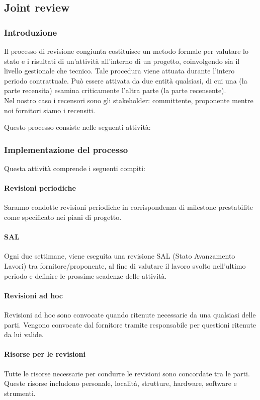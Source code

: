 \subsection{Joint review}
\subsubsection{Introduzione}
Il processo di revisione congiunta costituisce un metodo formale per valutare lo stato e i risultati di un'attività all'interno di un progetto, coinvolgendo sia il livello gestionale che tecnico. Tale procedura viene attuata durante l'intero periodo contrattuale. Può essere attivata da due entità qualsiasi, di cui una (la parte recensita) esamina criticamente l'altra parte (la parte recensente).
\\Nel nostro caso i recensori sono gli stakeholder: committente, proponente mentre noi fornitori siamo i recensiti.

Questo processo consiste nelle seguenti attività:

\subsubsection{Implementazione del processo}

Questa attività comprende i seguenti compiti:
\paragraph{Revisioni periodiche}
Saranno condotte revisioni periodiche in corrispondenza di milestone prestabilite come specificato nei piani di progetto.

\paragraph*{SAL}
Ogni due settimane, viene eseguita una revisione SAL (Stato Avanzamento Lavori) tra fornitore/proponente, al fine di valutare il lavoro svolto nell'ultimo periodo e definire le prossime scadenze delle attività.

\paragraph{Revisioni ad hoc}
Revisioni ad hoc sono convocate quando ritenute necessarie da una qualsiasi delle parti.
Vengono convocate dal fornitore tramite responsabile per questioni ritenute da lui valide.

\paragraph{Risorse per le revisioni}
Tutte le risorse necessarie per condurre le revisioni sono concordate tra le parti. Queste risorse includono personale, località, strutture, hardware, software e strumenti.

